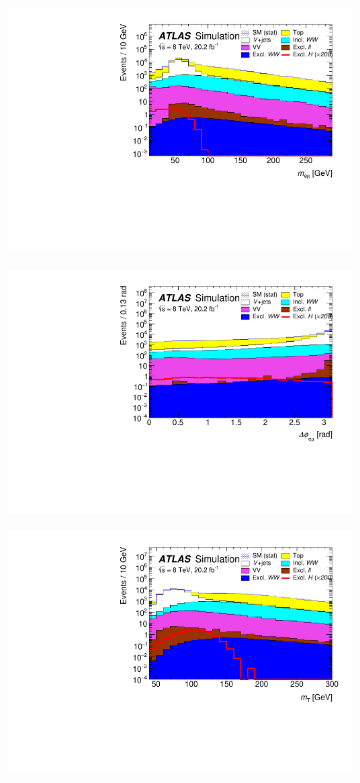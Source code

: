 \begin{figure}[!h]
\begin{subfigure}{0.5\textwidth}
   \includegraphics[width=\textwidth]{figures/emme-CutMll-Mll-log.pdf}
\end{subfigure}
\begin{subfigure}{0.5\textwidth}
   \includegraphics[width=\textwidth]{figures/emme-CutMll-DPhill-log.pdf}
\end{subfigure} 
\begin{subfigure}{0.5\textwidth}
   \includegraphics[width=\textwidth]{figures/emme-CutMll-MT-log.pdf}

\end{subfigure}
\end{figure}
